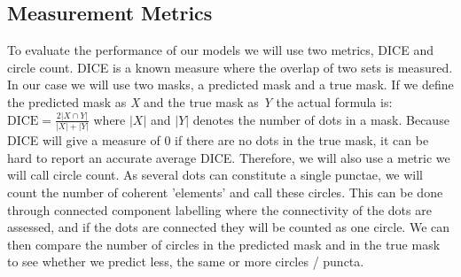 \subsection{Measurement Metrics}
To evaluate the performance of our models we will use two metrics, DICE and circle count. DICE is a known measure where the overlap of two sets is measured. In our case we will use two masks, a predicted mask and a true mask. If we define the predicted mask as \textit{X} and the true mask as \textit{Y} the actual formula is: $\text{DICE} = \frac{2|X\cap Y|}{|X| + |Y|}$ where $|X|$ and $|Y|$ denotes the number of dots in a mask. Because DICE will give a measure of 0 if there are no dots in the true mask, it can be hard to report an accurate average DICE. Therefore, we will also use a metric we will call circle count. As several dots can constitute a single punctae, we will count the number of coherent 'elements' and call these circles. This can be done through connected component labelling where the connectivity of the dots are assessed, and if the dots are connected they will be counted as one circle. We can then compare the number of circles in the predicted mask and in the true mask to see whether we predict less, the same or more circles / puncta.